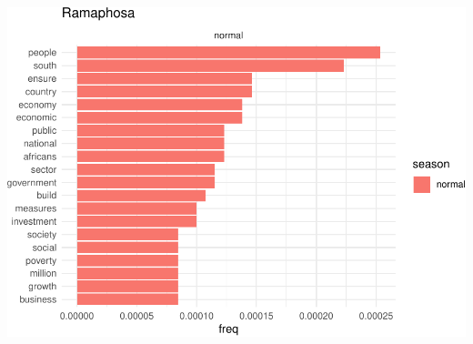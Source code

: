 \documentclass[]{article}
\begin{document}
\begin{center}\includegraphics{datasci_fi_Assignment_2_files/figure-latex/Ramaphosa -1} \end{center}
\end{document}

